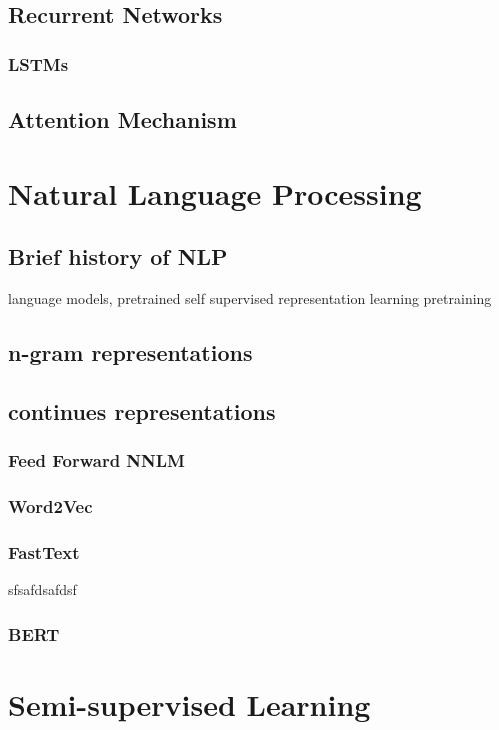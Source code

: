 \documentclass[11pt,oneside,a4paper]{book}
\theoremstyle{definition}
\DeclareRobustCommand{\[}{\begin{equation}}
\DeclareRobustCommand{\]}{\end{equation}}
\begin{document}
    \subsection{Recurrent Networks}
        \subsubsection{LSTMs}
    \subsection{Attention Mechanism}

\section{Natural Language Processing}
    \subsection{Brief history of NLP}
    language models, pretrained self supervised representation learning
    pretraining
    \subsection{n-gram representations}
    \subsection{continues representations}
        \subsubsection{Feed Forward NNLM}
        \subsubsection{Word2Vec}
        \subsubsection{FastText}
        sfsafdsafdsf
        
        \subsubsection{BERT}
        
\section{Semi-supervised Learning}
\end{document}

